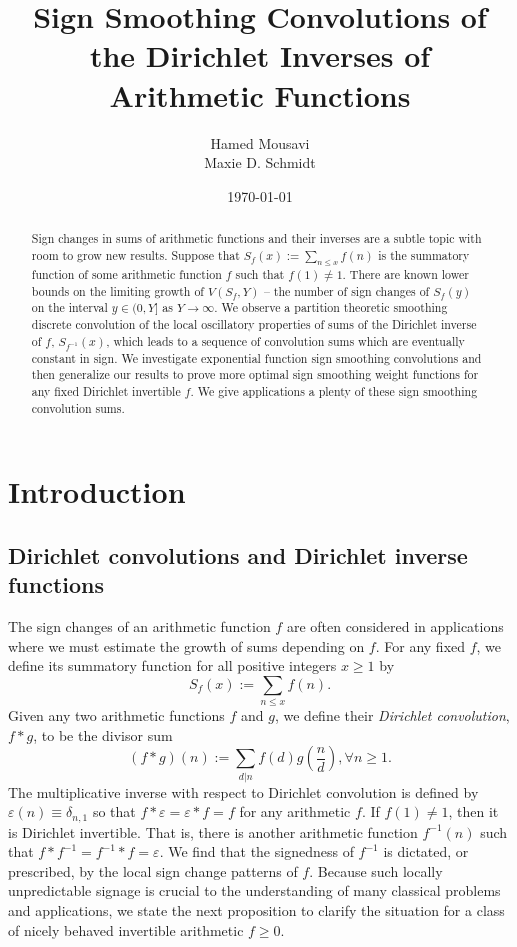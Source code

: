 \documentclass[11pt,reqno]{amsart}
\title[Sign Smoothing Convolutions]{
       Sign Smoothing Convolutions of the Dirichlet Inverses of Arithmetic Functions 
}
\author[H. Mousavi and M. D. Schmidt]{
         Hamed Mousavi \\ 
         Maxie D. Schmidt 
}
\date{\today}
\numberwithin{figure}{section}
\numberwithin{table}{section}
\theoremstyle{plain}
\numberwithin{theorem}{section}
\theoremstyle{definition}
\begin{document}
 

\begin{abstract} 
Sign changes in sums of arithmetic functions and their inverses are a subtle topic 
with room to grow new results. Suppose that $S_f(x) := \sum_{n \leq x} f(n)$ is the 
summatory function of some arithmetic function $f$ such that $f(1) \neq 1$. There are known 
lower bounds on the limiting growth of $V(S_f, Y)$ -- the number of sign changes of $S_f(y)$ 
on the interval $y \in (0, Y]$ as $Y \rightarrow \infty$. We observe a partition theoretic 
smoothing discrete convolution of the local oscillatory properties of sums of the 
Dirichlet inverse of $f$, $S_{f^{-1}}(x)$, which leads to a sequence of convolution sums which 
are eventually constant in sign. We investigate exponential function sign smoothing convolutions 
and then generalize our results to prove more optimal sign smoothing weight functions for any 
fixed Dirichlet invertible $f$. We give applications a plenty of these sign smoothing convolution 
sums. 
\end{abstract}

\maketitle

\section{Introduction} 

\subsection{Dirichlet convolutions and Dirichlet inverse functions} 

The sign changes of an arithmetic function $f$ are often considered in applications 
where we must estimate the growth of sums depending on $f$. For any fixed $f$, we 
define its summatory function for all positive integers $x \geq 1$ by 
\[
S_f(x) := \sum_{n \leq x} f(n). 
\]
Given any two arithmetic functions $f$ and $g$, we define their 
\emph{Dirichlet convolution}, $f \ast g$, to be the divisor sum 
\[
(f \ast g)(n) := \sum_{d|n} f(d) g\left(\frac{n}{d}\right), \forall n \geq 1. 
\] 
The multiplicative inverse with respect to Dirichlet convolution is defined by 
$\varepsilon(n) \equiv \delta_{n,1}$ so that $f \ast \varepsilon = \varepsilon \ast f = f$ for 
any arithmetic $f$. If $f(1) \neq 1$, then it is Dirichlet invertible. That is, there is another 
arithmetic function $f^{-1}(n)$ such that $f \ast f^{-1} = f^{-1} \ast f = \varepsilon$. 
We find that the signedness of $f^{-1}$ is dictated, or prescribed, by the local 
sign change patterns of $f$. 
Because such locally unpredictable signage is crucial to the understanding of many 
classical problems and applications, we state the next proposition to 
clarify the situation for a class of nicely behaved invertible arithmetic $f \geq 0$. 
\end{document}

